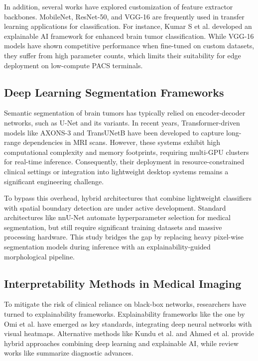 \documentclass[journal,twoside]{IEEEtran}
\begin{document}
In addition, several works have explored customization of feature extractor backbones. MobileNet, ResNet-50, and VGG-16 are frequently used in transfer learning applications for classification. For instance, Kumar S et al. \cite{kumar2024} developed an explainable AI framework for enhanced brain tumor classification. While VGG-16 models have shown competitive performance when fine-tuned on custom datasets, they suffer from high parameter counts, which limits their suitability for edge deployment on low-compute PACS terminals.

\subsection{Deep Learning Segmentation Frameworks}
Semantic segmentation of brain tumors has typically relied on encoder-decoder networks, such as U-Net and its variants. In recent years, Transformer-driven models like AXONS-3 \cite{abyasa2025} and TransUNetB \cite{khushubu2025} have been developed to capture long-range dependencies in MRI scans. However, these systems exhibit high computational complexity and memory footprints, requiring multi-GPU clusters for real-time inference. Consequently, their deployment in resource-constrained clinical settings or integration into lightweight desktop systems remains a significant engineering challenge.

To bypass this overhead, hybrid architectures that combine lightweight classifiers with spatial boundary detection are under active development. Standard architectures like nnU-Net automate hyperparameter selection for medical segmentation, but still require significant training datasets and massive processing hardware. This study bridges the gap by replacing heavy pixel-wise segmentation models during inference with an explainability-guided morphological pipeline.

\subsection{Interpretability Methods in Medical Imaging}
To mitigate the risk of clinical reliance on black-box networks, researchers have turned to explainability frameworks. Explainability frameworks like the one by Omi et al. \cite{omi2025} have emerged as key standards, integrating deep neural networks with visual heatmaps. Alternative methods like Kundu et al. \cite{kundu2025} and Ahmed et al. \cite{ahmed2025} provide hybrid approaches combining deep learning and explainable AI, while review works like \cite{review2025} summarize diagnostic advances.
\end{document}
